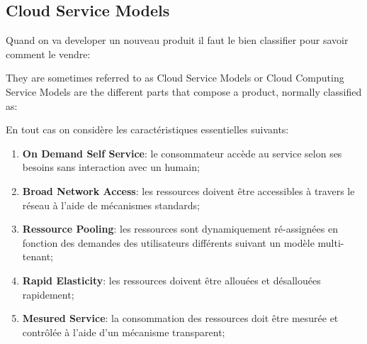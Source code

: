 \documentclass{article}
\begin{document}
\newpage\subsection{Cloud Service Models}
Quand on va developer un nouveau produit il faut le bien classifier pour savoir comment le vendre:
\begin{definition}
    They are sometimes referred to as Cloud Service Models or Cloud Computing Service Models are the different parts that compose a product, normally classified as:
    \begin{figure}[H]
        \centering{}
    \end{figure}
\end{definition}
En tout cas on considère les caractéristiques essentielles suivants:
\begin{enumerate}[rightmargin=\leftmargin]
    \item \textbf{On Demand Self Service}: le consommateur accède au service selon ses besoins sans interaction avec un humain;
    \item \textbf{Broad Network Access}: les ressources doivent être accessibles à travers le réseau à l'aide de mécanismes standards;
    \item \textbf{Ressource Pooling}: les ressources sont dynamiquement ré-assignées en fonction des demandes des utilisateurs différents suivant un modèle multi-tenant;
    \item \textbf{Rapid Elasticity}: les ressources doivent être allouées et désallouées rapidement;
    \item \textbf{Mesured Service}: la consommation des ressources doit être mesurée et contrôlée à l'aide d'un mécanisme transparent; 
\end{enumerate}
\end{document}
